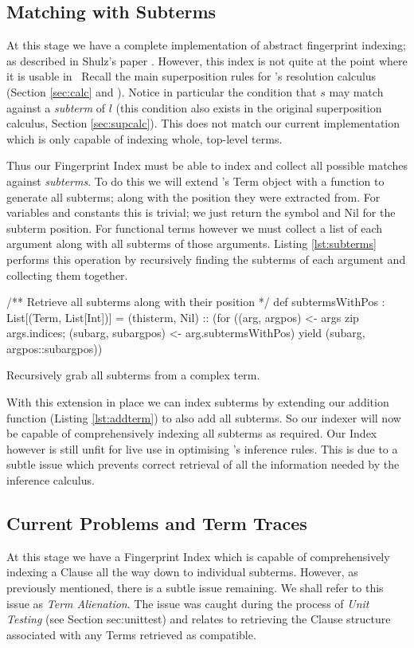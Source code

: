 \subsection{Matching with Subterms}

At this stage we have a complete implementation of abstract fingerprint indexing;
as described in Shulz's paper \cite{shulz12}. However, this index is not
quite at the point where it is usable in \beagle\ 
Recall the main superposition rules for \beagle's resolution calculus (Section \ref{sec:calc} and \cite{baum13}).
Notice in particular the condition that $s$ may match against a \emph{subterm}
of $l$ (this condition also exists in the original superposition calculus, Section \ref{sec:supcalc}).
This does not match our current implementation which is only capable of indexing
whole, top-level terms.

Thus our Fingerprint Index must be able to index and collect all possible matches against \emph{subterms}.
To do this we will extend \beagle's Term object with a function to generate all
subterms; along with the position they were extracted from. For variables and constants
this is trivial; we just return the symbol and Nil for the subterm position. For
functional terms however we must collect a list of each argument along with
all subterms of those arguments. Listing \ref{lst:subterms} performs this
operation by recursively finding the subterms of each argument and collecting
them together. 

\begin{listing}[H]
\begin{scalacode}
/** Retrieve all subterms along with their position */
def subtermsWithPos : List[(Term, List[Int])] = 
  (thisterm, Nil) :: (for 
    ((arg,    argpos)    <- args zip args.indices;
     (subarg, subargpos) <- arg.subtermsWithPos)
      yield  (subarg, argpos::subargpos))
\end{scalacode}
\caption{Recursively grab all subterms from a complex term.}
\label{lst:subterms}
\end{listing}
With this extension in place we can index subterms by extending our addition function
(Listing \ref{lst:addterm}) to also add all subterms.
So our indexer will now be capable of comprehensively indexing all subterms as required.
Our Index however is still unfit for live use in optimising \beagle's inference rules.
This is due to a subtle issue which prevents correct retrieval of all
the information needed by the inference calculus.

\subsection{Current Problems and Term Traces}
\label{sec:problems}
At this stage we have a Fingerprint Index which is capable of comprehensively indexing a Clause
all the way down to individual subterms. However, as previously mentioned,
there is a subtle issue remaining. We shall refer to this issue as \emph{Term Alienation}.
The issue was caught during the process of \emph{Unit Testing} (see Section {sec:unittest}) and relates
to retrieving the Clause structure associated with any Terms retrieved as compatible.

